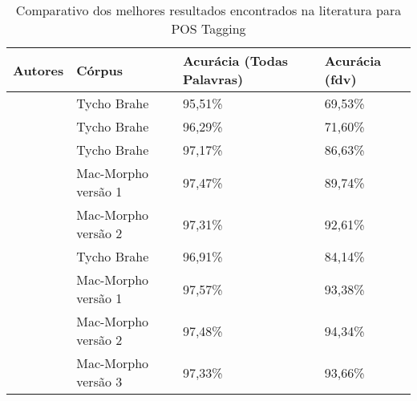 \begin{table}[!htb]
\footnotesize
\centering
\caption{Comparativo dos melhores resultados encontrados na literatura para POS Tagging}
\label{tab:comparacaotrabsrelac}
\begin{tabular}{llP{3cm}P{3cm}}
  \toprule
  \textbf{Autores} & \textbf{Córpus} & \textbf{Acurácia (Todas Palavras)} & \textbf{Acurácia (\ac{fdv})} \\
  \midrule
  \centering
   & Tycho Brahe & 95,51\% & 69,53\% \\
    & Tycho Brahe & 96,29\% & 71,60\% \\
   		 & Tycho Brahe & 97,17\% & 86,63\% \\
   		 & Mac-Morpho versão 1 & 97,47\% & 89,74\% \\
   		 & Mac-Morpho versão 2 & 97,31\% & 92,61\% \\
    & Tycho Brahe & 96,91\% & 84,14\% \\
    & Mac-Morpho versão 1 & 97,57\% & 93,38\% \\
    & Mac-Morpho versão 2 & 97,48\% & 94,34\% \\
    & Mac-Morpho versão 3 & 97,33\% & 93,66\% \\
  \bottomrule
\end{tabular}
\end{table}


